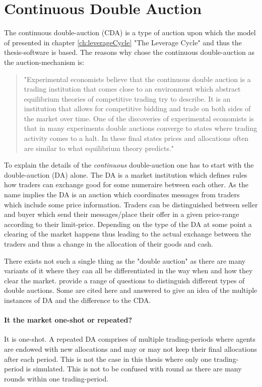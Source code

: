 \documentclass[../Bachelorarbeit.tex]{subfiles}
\begin{document}
\section{Continuous Double Auction}	
The continuous double-auction (CDA) is a type of auction upon which the model of \cite{Breuer2015} presented in chapter \ref{ch:leverageCycle} "The Leverage Cycle" and thus the thesis-software is based. The reasons why \cite{Breuer2015} chose the continuous double-auction as the auction-mechanism is:

\begin{quote}
"Experimental economists believe that the continuous double auction is a trading institution that comes close to an environment which abstract equilibrium theories of competitive trading try to describe. It is an institution that allows for competitive bidding and trade on both sides of the market over time. One of the discoveries of experimental economists is that in many experiments double auctions converge to states where trading activity comes to a halt. In these final states prices and allocations often are similar to what equilibrium theory predicts."
\end{quote}

\medskip

To explain the details of the \textit{continuous} double-auction one has to start with the double-auction (DA) alone. The DA is a \gls{market institution} which defines rules how traders can exchange \gls{good} for some \gls{numeraire} between each other. As the name implies the DA is an \gls{auction} which coordinates messages from traders which include some price information. Traders can be distinguished between \gls{seller} and \gls{buyer} which send their messages/place their \gls{offer} in a given price-range according to their \gls{limit-price}. Depending on the type of the DA at some point a \gls{clearing} of the market happens thus leading to the actual exchange between the traders and thus a change in the allocation of their goods and cash.

\medskip
There exists not such a single thing as the "double auction" as there are many variants of it where they can all be differentiated in the way when and how they clear the market. \cite{Parsons2006} provide a range of questions to distinguish different types of double auctions. Some are cited here and answered to give an idea of the multiple instances of DA and the difference to the CDA.

\paragraph{It the market one-shot or repeated?} It is one-shot. A repeated DA comprises of multiple trading-periods where agents are endowed with new allocations and may or may not keep their final allocations after each period. This is not the case in this thesis where only one trading-period is simulated. This is not to be confused with \Gls{round} as there are many rounds within one trading-period.
\end{document}
